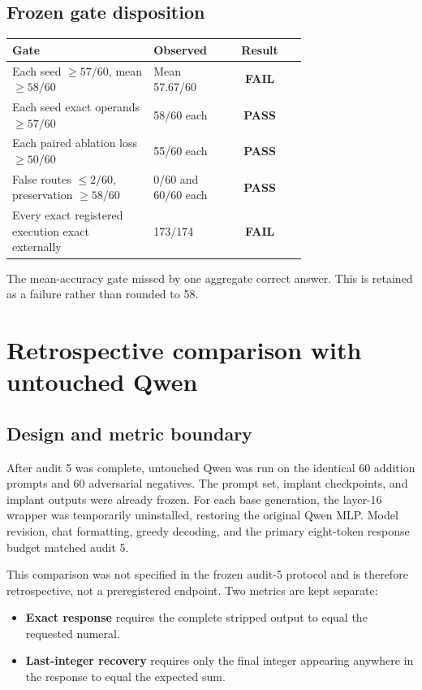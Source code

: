 \documentclass[11pt]{article}
\newcommand{\pass}{\textcolor{passgreen}{\textbf{PASS}}}
\newcommand{\fail}{\textcolor{failred}{\textbf{FAIL}}}
\begin{document}
\subsection{Frozen gate disposition}

\begin{center}
\small
\begin{tabular}{p{0.48\linewidth}p{0.24\linewidth}c}
\toprule
Gate & Observed & Result\\
\midrule
Each seed $\geq57/60$, mean $\geq58/60$ & Mean 57.67/60 & \fail\\
Each seed exact operands $\geq57/60$ & 58/60 each & \pass\\
Each paired ablation loss $\geq50/60$ & 55/60 each & \pass\\
False routes $\leq2/60$, preservation $\geq58/60$ & 0/60 and 60/60 each & \pass\\
Every exact registered execution exact externally & 173/174 & \fail\\
\bottomrule
\end{tabular}
\end{center}

The mean-accuracy gate missed by one aggregate correct answer. This is retained
as a failure rather than rounded to 58.

\section{Retrospective comparison with untouched Qwen}

\subsection{Design and metric boundary}

After audit 5 was complete, untouched Qwen was run on the identical 60
addition prompts and 60 adversarial negatives. The prompt set, implant
checkpoints, and implant outputs were already frozen. For each base generation,
the layer-16 wrapper was temporarily uninstalled, restoring the original Qwen
MLP. Model revision, chat formatting, greedy decoding, and the primary
eight-token response budget matched audit 5.

This comparison was not specified in the frozen audit-5 protocol and is
therefore retrospective, not a preregistered endpoint. Two metrics are kept
separate:

\begin{itemize}
\item \textbf{Exact response} requires the complete stripped output to equal
      the requested numeral.
\item \textbf{Last-integer recovery} requires only the final integer appearing
      anywhere in the response to equal the expected sum.
\end{itemize}
\end{document}
